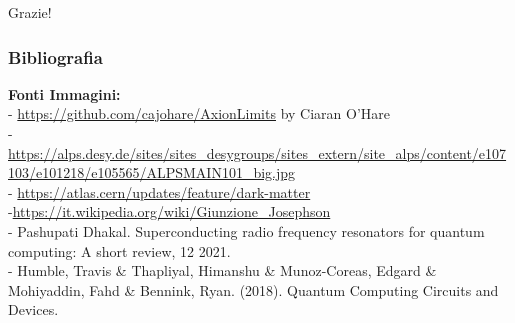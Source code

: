 \documentclass[10pt]{beamer}
\begin{document}
\begin{frame}
\textcolor{myNewColorA}{\Huge{\centerline{Grazie!}}}
\end{frame}



\begin{frame}[allowframebreaks]
        \frametitle{Bibliografia}
        
        
        \nocite{*}
        \textbf{Fonti Immagini:}\\
        - \url{https://github.com/cajohare/AxionLimits}  by Ciaran O’Hare\\
        
        - \url{https://alps.desy.de/sites/sites_desygroups/sites_extern/site_alps/content/e107103/e101218/e105565/ALPSMAIN101_big.jpg}\\
        
        - \url{https://atlas.cern/updates/feature/dark-matter}\\
        
        
        -\url{https://it.wikipedia.org/wiki/Giunzione_Josephson}\\
        
        - Pashupati Dhakal. Superconducting radio frequency resonators for quantum computing: A short review, 12 2021.\\
        
        - Humble, Travis \& Thapliyal, Himanshu \& Munoz-Coreas, Edgard \& Mohiyaddin, Fahd \& Bennink, Ryan. (2018). Quantum Computing Circuits and Devices. \\

\end{frame}
\end{document}
